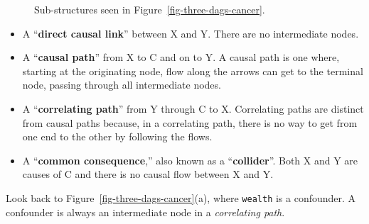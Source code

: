 \documentclass[
  letterpaper,
  DIV=11,
  numbers=noendperiod,
  oneside]{scrartcl}
\begin{document}
\begin{figure}
\begin{minipage}{0.25\linewidth}
{}


\end{minipage}%
%
\begin{minipage}{0.25\linewidth}



\end{minipage}%

\caption{\label{fig-dags-paths}Sub-structures seen in
Figure~\ref{fig-three-dags-cancer}.}

\end{figure}%

\begin{itemize}
\item
  A ``\textbf{direct causal link}'' between X and Y. There are no
  intermediate nodes.
\item
  A ``\textbf{causal path}'' from X to C and on to Y. A causal path is
  one where, starting at the originating node, flow along the arrows can
  get to the terminal node, passing through all intermediate nodes.
\item
  A ``\textbf{correlating path}'' from Y through C to X. Correlating
  paths are distinct from causal paths because, in a correlating path,
  there is no way to get from one end to the other by following the
  flows.
\item
  A ``\textbf{common consequence},'' also known as a
  ``\textbf{collider}''. Both X and Y are causes of C and there is no
  causal flow between X and Y.
\end{itemize}

Look back to Figure~\ref{fig-three-dags-cancer}(a), where
\texttt{wealth} is a confounder. A confounder is always an intermediate
node in a \emph{correlating path}.
\end{document}
